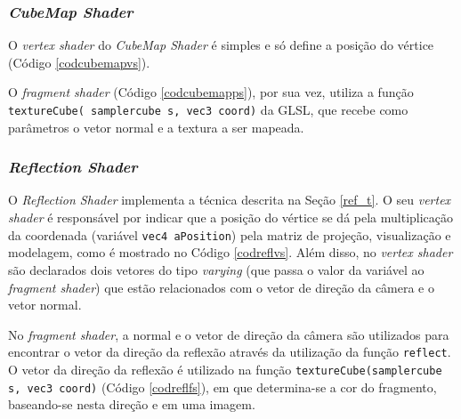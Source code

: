 \subsubsection{\textit{CubeMap Shader}}	

	 O \textit{vertex shader} do \textit{CubeMap Shader} é simples e só define a posição do vértice (Código \ref{codcubemapvs}). 

	

	O  \textit{fragment shader} (Código \ref{codcubemapps}), por sua vez, utiliza a função \texttt{textureCube( samplercube s, vec3 coord)} da GLSL, que recebe como parâmetros o vetor normal e a textura a ser mapeada. 

	
	
\subsubsection{\textit{Reflection Shader}}

	O \textit{Reflection Shader} implementa a técnica descrita na Seção \ref{ref_t}. O seu \textit{vertex shader} é responsável por indicar que a posição do vértice se dá pela multiplicação da coordenada (variável \texttt{vec4 aPosition}) pela matriz de projeção, visualização e modelagem, como é mostrado no Código \ref{codreflvs}. Além disso, no \textit{vertex shader} são declarados dois vetores do tipo \textit{varying} (que passa o valor da variável ao \textit{fragment shader}) que estão relacionados com o vetor de direção da câmera e o vetor normal. 

	

	No \textit{fragment shader}, a normal e o vetor de direção da câmera são utilizados para encontrar o vetor da direção da reflexão através da utilização da função \texttt{reflect}. O vetor da direção da reflexão é utilizado na função \texttt{textureCube(samplercube s, vec3 coord)} (Código \ref{codreflfs}), em que determina-se a cor do fragmento, baseando-se nesta direção e em uma imagem. 

	

